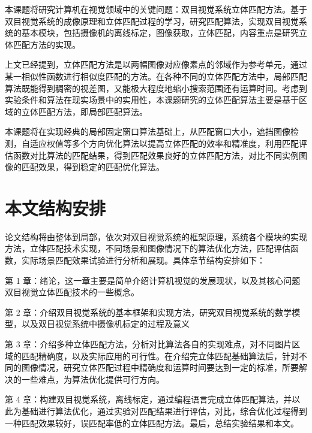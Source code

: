 本课题将研究计算机在视觉领域中的关键问题：双目视觉系统立体匹配方法。基于双目视觉系统的成像原理和立体匹配过程的学习，研究匹配算法，实现双目视觉系统的基本模块，包括摄像机的离线标定，图像获取，立体匹配，内容重点是研究立体匹配方法的实现。

上文已经提到，立体匹配方法是以两幅图像对应像素点的邻域作为参考单元，通过某一相似性函数进行相似度匹配的方法。在各种不同的立体匹配方法中，局部匹配算法既能得到稠密的视差图，又能极大程度地缩小搜索范围还有运算时间。考虑到实验条件和算法在现实场景中的实用性，本课题研究的立体匹配算法主要是基于区域的立体匹配方法，即局部匹配算法。

本课题将在实现经典的局部固定窗口算法基础上，从匹配窗口大小，遮挡图像检测，自适应权值等多个方向优化算法以提高立体匹配的效率和精准度，利用匹配评估函数对比算法的匹配结果，得到匹配效果良好的立体匹配方法，对比不同实例图像的匹配效果，得到稳定的匹配优化算法。

\section{本文结构安排}

论文结构将由整体到局部，依次对双目视觉系统的框架原理，系统各个模块的实现方法，立体匹配技术实现，不同场景和图像情况下的算法优化方法，匹配评估函数，实际场景匹配效果试验进行分析和展现。具体章节结构安排如下：

第 1 章：绪论，这一章主要是简单介绍计算机视觉的发展现状，以及其核心问题双目视觉立体匹配技术的一些概念。 

第 2 章：介绍双目视觉系统的基本框架和实现方法，研究双目视觉系统的数学模型，以及双目视觉系统中摄像机标定的过程及意义

第 3 章：介绍多种立体匹配方法，分析对比算法各自的实现难点，对不同图片区域的匹配精确度，以及实际应用的可行性。在介绍完立体匹配基础算法后，针对不同的图像情况，研究立体匹配过程中精确度和运算时间要达到一定的标准，所要解决的一些难点，为算法优化提供可行方向。

第 4 章：构建双目视觉系统，离线标定，通过编程语言完成立体匹配算法，并以此为基础进行算法优化，通过实验对匹配结果进行评估，对比，综合优化过程得到一种匹配效果较好，误匹配率低的立体匹配方法。最后，总结实验结果和本文。



